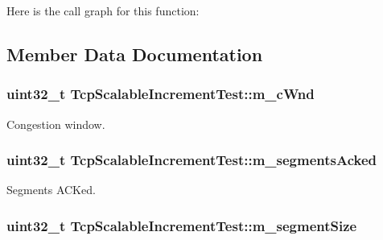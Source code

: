 Here is the call graph for this function\+:




\subsection{Member Data Documentation}
\subsubsection[{\texorpdfstring{m\+\_\+c\+Wnd}{m_cWnd}}]{\setlength{\rightskip}{0pt plus 5cm}uint32\+\_\+t Tcp\+Scalable\+Increment\+Test\+::m\+\_\+c\+Wnd\hspace{0.3cm}{\ttfamily [private]}}\hypertarget{classTcpScalableIncrementTest_aebed656e82b5ef378398041ab9cc13d7}{}\label{classTcpScalableIncrementTest_aebed656e82b5ef378398041ab9cc13d7}


Congestion window. 

\subsubsection[{\texorpdfstring{m\+\_\+segments\+Acked}{m_segmentsAcked}}]{\setlength{\rightskip}{0pt plus 5cm}uint32\+\_\+t Tcp\+Scalable\+Increment\+Test\+::m\+\_\+segments\+Acked\hspace{0.3cm}{\ttfamily [private]}}\hypertarget{classTcpScalableIncrementTest_aa174cee1d0796100acce381c38c0d453}{}\label{classTcpScalableIncrementTest_aa174cee1d0796100acce381c38c0d453}


Segments A\+C\+Ked. 

\subsubsection[{\texorpdfstring{m\+\_\+segment\+Size}{m_segmentSize}}]{\setlength{\rightskip}{0pt plus 5cm}uint32\+\_\+t Tcp\+Scalable\+Increment\+Test\+::m\+\_\+segment\+Size\hspace{0.3cm}{\ttfamily [private]}}\hypertarget{classTcpScalableIncrementTest_a68b87b3ea5d26df154b3ce7ae0cf3a7c}{}\label{classTcpScalableIncrementTest_a68b87b3ea5d26df154b3ce7ae0cf3a7c}


